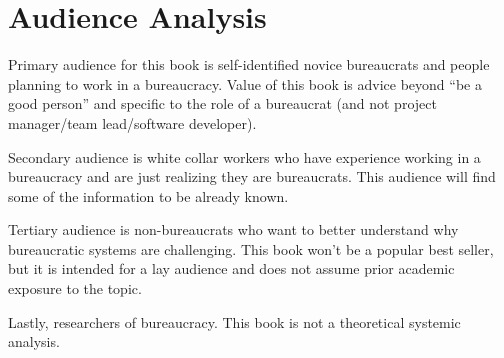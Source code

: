 \section{Audience Analysis}

Primary audience for this book is self-identified novice bureaucrats and people planning to work in a bureaucracy. Value of this book is advice beyond ``be a good person'' and specific to the role of a bureaucrat (and not project manager/team lead/software developer). 

Secondary audience is white collar workers who have experience working in a bureaucracy and are just realizing they are bureaucrats. This audience will find some of the information to be already known. 

Tertiary audience is non-bureaucrats who want to better understand why bureaucratic systems are challenging. This book won't be a popular best seller, but it is intended for a lay audience and does not assume prior academic exposure to the topic.

Lastly, researchers of bureaucracy. This book is not a theoretical systemic analysis. 